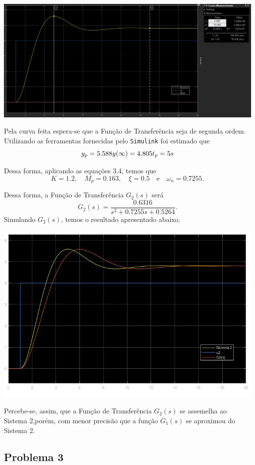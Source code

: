 \documentclass[
]{book}
\begin{document}
\includegraphics{Imagens/Lab3/Resolução/prob2A.jpg}

Pela curva feita espera-se que a Função de Transferência seja de segunda ordem. Utilizando as ferramentas fornecidas pelo \texttt{Simulink} foi estimado que
\[
y_p = 5.588\\
y(\infty) = 4.805 \\
t_p = 5s
\]

Dessa forma, aplicando as equações 3.4, temos que
\[
K = 1.2, \quad M_p = 0.163, \quad \xi = 0.5 \quad \text{e} \quad \omega_n = 0.7255.
\]

Dessa forma, a Função de Transferência \(G_2(s)\) será
\[
G_2(s) = \frac {0.6316}{s^2 + 0.7255s + 0.5264}.
\]
Simulando \(G_2(s)\), temos o resultado apresentado abaixo.

\includegraphics{Imagens/Lab3/Resolução/prob2B.jpg}

Percebe-se, assim, que a Função de Transferência \(G_2(s)\) se assemelha ao Sistema 2,porém, com menor precisão que a função \(G_1(s)\) se aproximou do Sistema 2.

\hypertarget{problema-3-1}{%
\subsection*{Problema 3}\label{problema-3-1}}
\end{document}
